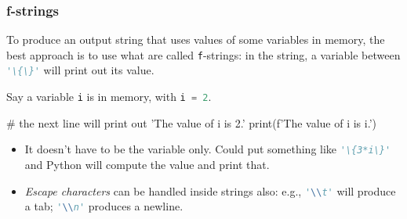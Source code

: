 \documentclass{beamer}
\newenvironment{codeblock}
    {\hfill\begin{beamerboxesrounded}[lower=codecol, width=0.8\textwidth]
    \medskip

    }
    { 
    \end{beamerboxesrounded}\hfill
    }
\theoremstyle{example}
\newcommand{\ct}[1]{\lstinline[language=Python,basicstyle=\ttfamily\footnotesize,stringstyle=\small\color{strings}]!#1!}
\newcommand{\ttt}[1]{{\small\texttt{#1}}}
\newcommand{\comment}[1]{}
\begin{document}
\begin{frame}[fragile]
\frametitle{{\ttm f}-strings}

To produce an output string that uses values of some variables in memory, the best approach is to use what are called \ttt{f}-strings: in the string, a variable between \ct{'\{\}'} will print out its value.

\pause
Say a variable \ct{i} is in memory, with \ct{i = 2}.

\begin{codeblock}

\begin{python}
# the next line will print out 'The value of i is 2.'
print(f'The value of i is {i}.')
\end{python}

\end{codeblock}

\pause
\begin{itemize}
	\item It doesn't have to be the variable only. Could put something like \ct{'\{3*i\}'} and Python will compute the value and print that.
	\item \emph{Escape characters} can be handled inside strings also: e.g., \ct{'\\t'} will produce a tab; \ct{'\\n'} produces a newline.
\end{itemize}

\end{frame}

\comment{
\begin{frame}[fragile]
\frametitle{Two more container types}

Two important types that contain items, but are not sequential are sets ({\ttb set} type) and dictionaries ({\ttb dict} type).

\begin{itemize}
	\item {\ttb set}: roughly matches the mathematical notion of a set. Items are not ordered; there are no repeated items.
	\item {\ttb dict}: has \emph{dictionary keys}; for each key there is an item (the ``entry'' for that key).
	\item Two example dictionaries with same keys:
\end{itemize}

\begin{codeblock}

\begin{python}
my_pet = {'name':'Spot', 'age':4, 'type':'dog'}
neighbor_pet = {'name':'Checkers', 'age':2, 'type':'dog'}
\end{python}

\end{codeblock}

\vspace*{12pt}
Good idea to work with dictionaries for certain kinds of data. Later in the semester, will work with something very similar to a dictionary {--} a DataFrame.
\end{frame}
}
\end{document}
